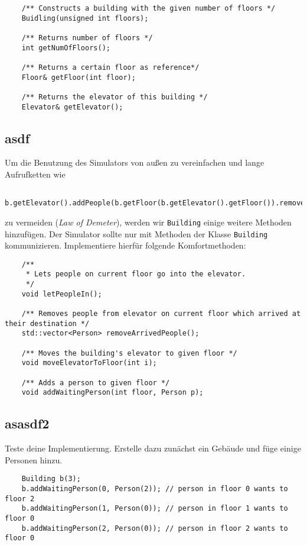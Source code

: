 \begin{lstlisting}
	/** Constructs a building with the given number of floors */
	Buidling(unsigned int floors);
	
	/** Returns number of floors */
	int getNumOfFloors();
	
	/** Returns a certain floor as reference*/
	Floor& getFloor(int floor);
	
	/** Returns the elevator of this building */
	Elevator& getElevator();
\end{lstlisting}


\subsection{asdf}
Um die Benutzung des Simulators von außen zu vereinfachen und lange Aufrufketten wie
\begin{lstlisting}
	b.getElevator().addPeople(b.getFloor(b.getElevator().getFloor()).removeAllPeople());
\end{lstlisting}

zu vermeiden (\emph{Law of Demeter}), werden wir \texttt{Building} einige weitere Methoden hinzufügen.
Der Simulator sollte nur mit Methoden der Klasse \texttt{Building} kommunizieren.
Implementiere hierfür folgende Komfortmethoden:

\begin{lstlisting}
	/**
	 * Lets people on current floor go into the elevator.
	 */
	void letPeopleIn();
	
	/** Removes people from elevator on current floor which arrived at their destination */
	std::vector<Person> removeArrivedPeople();
	
	/** Moves the building's elevator to given floor */
	void moveElevatorToFloor(int i);
	
	/** Adds a person to given floor */
	void addWaitingPerson(int floor, Person p);
\end{lstlisting}

\subsection{asasdf2}
Teste deine Implementierung.
Erstelle dazu zunächst ein Gebäude und füge einige Personen hinzu.

\begin{lstlisting}
	Building b(3);
	b.addWaitingPerson(0, Person(2)); // person in floor 0 wants to floor 2
	b.addWaitingPerson(1, Person(0)); // person in floor 1 wants to floor 0
	b.addWaitingPerson(2, Person(0)); // person in floor 2 wants to floor 0
\end{lstlisting}

